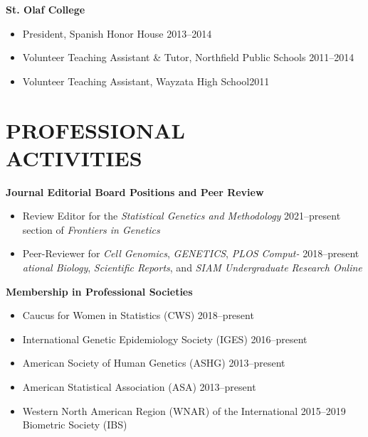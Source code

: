 \documentclass[margin]{res}
\begin{document}
\begin{resume}
\textbf{St. Olaf College}
\begin{itemize}
			\item President, Spanish Honor House \hfill 2013--2014
			\item Volunteer Teaching Assistant \& Tutor, Northfield Public Schools \hfill 2011--2014
			\item Volunteer Teaching Assistant, Wayzata High School\hfill 2011 \\
\end{itemize}

\section{PROFESSIONAL \\ ACTIVITIES}  

\hspace{0.1cm}\textbf{Journal Editorial Board Positions and Peer Review} 
\begin{itemize} %
\item Review Editor for the \textit{Statistical Genetics and Methodology}  \hfill 2021--present \\ section of \textit{Frontiers in Genetics} 
\item Peer-Reviewer for \textit{Cell Genomics}, \textit{GENETICS}, \textit{PLOS Comput-} \hfill 2018--present \\  \textit{ational Biology},   \textit{Scientific Reports},  and \textit{SIAM Undergraduate Research Online} %
\end{itemize} %

\hspace{0.1cm}\textbf{Membership in Professional Societies}
\begin{itemize}	 %
\item Caucus for Women in Statistics (CWS) \hfill 2018--present
\item International Genetic Epidemiology Society (IGES) \hfill 2016--present
\item American Society of Human Genetics (ASHG) \hfill 2013--present
\item American Statistical Association (ASA) \hfill 2013--present
\item Western North American Region (WNAR) of the International \hfill 2015--2019 \\  Biometric Society (IBS)  %
\end{itemize}
	

\end{resume}
\end{document}
